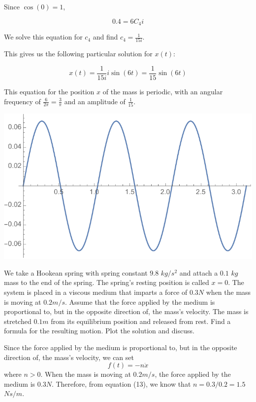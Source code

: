 \documentclass[11pt,answers]{exam}
\begin{document}
\begin{questions}
\begin{solution}
Since $\cos{(0)} = 1$,

\begin{equation}
0.4 = 6 C_{4} i 
\end{equation}

We solve this equation for $c_{4}$ and find $c_{4} = \frac{1}{15i}$. 

This gives us the following particular solution for $x(t)$:

\begin{equation}
x(t) = \frac{1}{15i} i \sin{(6t)} = \frac{1}{15} \sin{(6t)}
\end{equation}

This equation for the position $x$ of the mass is periodic, with an angular frequency of $\frac{6}{2 \pi} = \frac{3}{\pi}$ and an amplitude of $\frac{1}{15}$. 
 

\includegraphics{p16plot.pdf}
\end{solution}

\pagebreak

\item We take a Hookean spring with spring constant $9.8$ $kg/s^2$ and attach a $0.1$ $kg$ mass to the end of the spring. The spring’s resting position is called $x = 0$. The system is placed in a viscous medium that imparts a force of $0.3 N$ when the mass is moving at $0.2 m/s$. Assume that the force applied by the medium is proportional to, but in the opposite direction of, the mass’s velocity. The mass is stretched $0.1 m$ from its equilibrium position and released from rest. Find a formula for the resulting motion. Plot the solution and discuss.

\begin{solution}
Since the force applied by the medium is proportional to, but in the opposite direction of, the mass’s velocity, we can set
\begin{equation}
f(t) = -n \dot{x}    
\end{equation}
where $n>0$. 
When the mass is moving at $0.2 m/s$, the force applied by the medium is $0.3 N$. Therefore, from equation (13), we know that $n=0.3/0.2=1.5$ $Ns/m$. 


\end{solution}
\end{questions}
\end{document}
